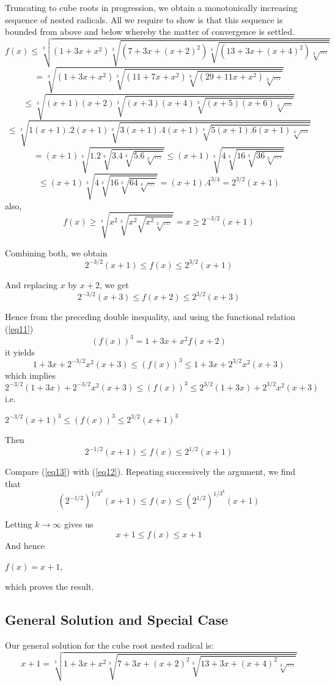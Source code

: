 \documentclass[runningheads]{llncs}
\begin{document}
Truncating to cube roots in progression, we obtain a monotonically increasing sequence of nested radicals. All we require to show is that this sequence is bounded from above and below whereby the matter of convergence is settled.
\[f(x) \leq \sqrt[3]{(1+3x+x^2)\sqrt[3]{(7+3x+(x+2)^2)\sqrt[3]{(13+3x+(x+4)^2)\sqrt[3]{...}}}} \]
\[ = \sqrt[3]{(1+3x+x^2)\sqrt[3]{(11+7x+x^2)\sqrt[3]{(29+11x+x^2)\sqrt[3]{...}}}} \]
\[ \leq \sqrt[3]{(x+1)(x+2)\sqrt[3]{(x+3)(x+4)\sqrt[3]{(x+5)(x+6)\sqrt[3]{...}}}}\]
\[ \leq \sqrt[3]{1(x+1).2(x+1)\sqrt[3]{3(x+1).4(x+1)\sqrt[3]{5(x+1).6(x+1)\sqrt[3]{...}}}}\]
\[ = (x+1)\sqrt[3]{1.2\sqrt[3]{3.4\sqrt[3]{5.6\sqrt[3]{...}}}} 
\leq (x+1)\sqrt[3]{4\sqrt[3]{16\sqrt[3]{36\sqrt[3]{...}}}} \]
\[ \leq (x+1)\sqrt[3]{4\sqrt[3]{16\sqrt[3]{64\sqrt[3]{...}}}} 
= (x+1).4^{3/4} 
= 2^{3/2}(x+1)\]
also, \[ f(x) \geq \sqrt[3]{x^2\sqrt[3]{x^2\sqrt{x^2\sqrt[3]{...}}}} = x \geq 2^{-3/2}(x+1) \] 

Combining both, we obtain
\begin{equation} \label{eq12}
2^{-3/2}(x+1) \leq f(x) \leq 2^{3/2}(x+1)
\end{equation}

And replacing $ x $ by $ x+2 $, we get 
\[ 2^{-3/2}(x+3) \leq f(x+2) \leq 2^{3/2}(x+3) \]

Hence from the preceding double inequality, and using the functional relation (\ref{eq11})
\[ (f(x))^3 = 1+3x+x^2f(x+2) \]
it yields
\[ 1+3x+2^{-3/2}x^2(x+3) \leq (f(x))^3 \leq 1+3x+2^{3/2}x^2(x+3) \]
which implies
\[ 2^{-3/2}(1+3x)+2^{-3/2}x^2(x+3) \leq (f(x))^3 \leq 2^{3/2}(1+3x)+2^{3/2}x^2(x+3) \]
i.e. \centerline{ $ 2^{-3/2}(x+1)^3 \leq (f(x))^3 \leq 2^{3/2}(x+1)^3 $ } 
Then 
\begin{equation} \label{eq13}
2^{-1/2}(x+1) \leq f(x) \leq 2^{1/2}(x+1)
\end{equation}

Compare (\ref{eq13}) with (\ref{eq12}). Repeating successively the argument, we find that
\[ (2^{-1/2})^{1/3^k}(x+1) \leq f(x) \leq (2^{1/2})^{1/3^k}(x+1) \]

Letting $ k\to\infty $ gives us
\[ x+1 \leq f(x) \leq x+1 \]
And hence \centerline{$ f(x) = x+1 $,}
which proves the result.

\subsection{General Solution and Special Case}
Our general solution for the cube root nested radical is:
\[ x+1 = \sqrt[3]{1+3x+x^2\sqrt[3]{7+3x+(x+2)^2\sqrt[3]{13+3x+(x+4)^2\sqrt[3]{...}}}} \tag{9} \]
\end{document}
